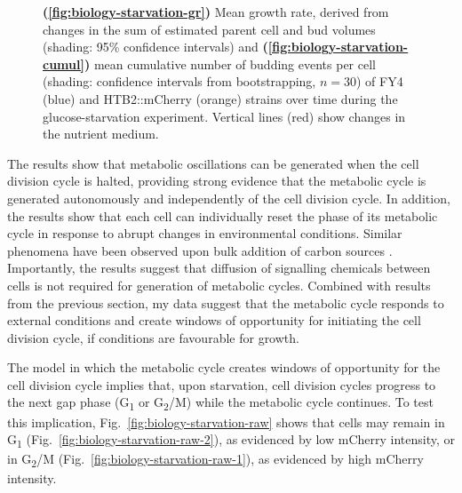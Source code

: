\begin{figure}
  \caption[
    Mean growth rate, derived from changes in the sum of estimated parent cell and bud volumes and
    mean cumulative number of budding events per cell
    of FY4 and HTB2::mCherry strains over time during the glucose-starvation experiment.
  ]{
    \textbf{(\ref{fig:biology-starvation-gr})}
    Mean growth rate, derived from changes in the sum of estimated parent cell and bud volumes (shading: 95\% confidence intervals) and
    \textbf{(\ref{fig:biology-starvation-cumul})}
    mean cumulative number of budding events per cell (shading: confidence intervals from bootstrapping, $n=30$)
    of FY4 (blue) and HTB2::mCherry (orange) strains over time during the glucose-starvation experiment.
    Vertical lines (red) show changes in the nutrient medium.
  }
  \label{fig:biology-starvation-gr-budprob}
\end{figure}

The results show that metabolic oscillations can be generated when the cell division cycle is halted, providing strong evidence that the metabolic cycle is generated autonomously and independently of the cell division cycle.
In addition, the results show that each cell can individually reset the phase of its metabolic cycle in response to abrupt changes in environmental conditions.
Similar phenomena have been observed upon bulk addition of carbon sources \parencite{kuangMsn2RegulateExpression2017, krishnaMinimalPushPull2018}.
Importantly, the results suggest that diffusion of signalling chemicals between cells is not required for generation of metabolic cycles.
Combined with results from the previous section, my data suggest that the metabolic cycle responds to external conditions and create windows of opportunity for initiating the cell division cycle, if conditions are favourable for growth.

The model in which the metabolic cycle creates windows of opportunity for the cell division cycle implies that, upon starvation, cell division cycles progress to the next gap phase (G\textsubscript{1} or G\textsubscript{2}/M) while the metabolic cycle continues.
To test this implication, Fig.\ \ref{fig:biology-starvation-raw} shows that cells may remain in G\textsubscript{1} (Fig.\ \ref{fig:biology-starvation-raw-2}), as evidenced by low mCherry intensity, or in G\textsubscript{2}/M (Fig.\ \ref{fig:biology-starvation-raw-1}), as evidenced by high mCherry intensity.

